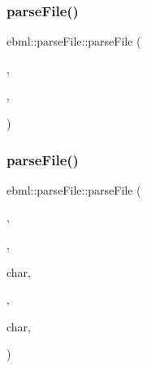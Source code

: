 \mbox{\label{classebml_1_1parseFile_ace383c50a02485d9f5bd8613e55c6350}} 
\subsubsection{\texorpdfstring{parse\+File()}{parseFile()}\hspace{0.1cm}{\footnotesize\ttfamily [8/10]}}
{\footnotesize\ttfamily ebml\+::parse\+File\+::parse\+File (\begin{DoxyParamCaption}\item[{\mbox{\hyperlink{namespaceebml_a7bb59128ac6af27e47367938a846b569}{io\+Base\+\_\+sp}} \&}]{,  }\item[{off\+\_\+t}]{,  }\item[{\mbox{\hyperlink{classebml_1_1parseFile}{parse\+File}} \&}]{ }\end{DoxyParamCaption})}

\mbox{\label{classebml_1_1parseFile_ae1d5a9baefe4833184ce72703968cc04}} 
\subsubsection{\texorpdfstring{parse\+File()}{parseFile()}\hspace{0.1cm}{\footnotesize\ttfamily [9/10]}}
{\footnotesize\ttfamily ebml\+::parse\+File\+::parse\+File (\begin{DoxyParamCaption}\item[{\mbox{\hyperlink{classebml_1_1ioBase}{io\+Base}} $\ast$}]{,  }\item[{\mbox{\hyperlink{namespaceebml_a86c5f604ddf12a74aa9812e997a58691}{ebml\+I\+D\+\_\+t}}}]{,  }\item[{unsigned}]{char,  }\item[{size\+\_\+t}]{,  }\item[{unsigned}]{char,  }\item[{off\+\_\+t}]{ }\end{DoxyParamCaption})\hspace{0.3cm}{\ttfamily [protected]}}

\mbox{\label{classebml_1_1parseFile_a9ba34b6b0042dcb30bb69c6e07d8573f}} 
